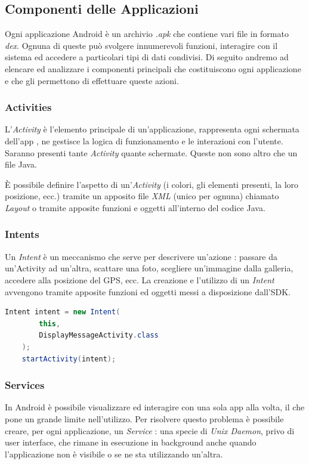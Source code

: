 \subsection{Componenti delle Applicazioni}
Ogni applicazione Android è un archivio \textit{.apk} che contiene vari file in formato \textit{dex}. Ognuna di queste può svolgere innumerevoli funzioni, interagire con il sistema ed accedere a particolari tipi di dati condivisi. Di seguito andremo ad elencare ed analizzare i componenti principali che costituiscono ogni applicazione e che gli permettono di effettuare queste azioni.

\subsubsection{Activities}
L'\textit{Activity} è l'elemento principale di un'applicazione, rappresenta ogni schermata dell'app \cite{androides}, ne gestisce la logica di funzionamento e le interazioni con l'utente. Saranno presenti tante \textit{Activity} quante schermate. Queste non sono altro che un file Java.

È possibile definire l'aspetto di un'\textit{Activity} (i colori, gli elementi presenti, la loro posizione, ecc.) tramite un apposito file \textit{XML} (unico per ognuna) chiamato \textit{Layout} o tramite apposite funzioni e oggetti all'interno del codice Java.

\subsubsection{Intents}
Un \textit{Intent} è un meccanismo che serve per descrivere un'azione \cite{androides}: passare da un'Activity ad un'altra, scattare una foto, scegliere un'immagine dalla galleria, accedere alla posizione del GPS, ecc.
La creazione e l'utilizzo di un \textit{Intent} avvengono tramite apposite funzioni ed oggetti messi a disposizione dall'SDK.\\

\begin{lstlisting}[language=Java, caption=Esempio di codice Java per l'avvio di un'Activity tramite Intent]
    Intent intent = new Intent(
        this, 
        DisplayMessageActivity.class
    );
    startActivity(intent);
\end{lstlisting}

\subsubsection{Services}
In Android è possibile visualizzare ed interagire con una sola app alla volta, il che pone un grande limite nell'utilizzo. Per risolvere questo problema è possibile creare, per ogni applicazione, un \textit{Service} \cite{androides}: una specie di \textit{Unix Daemon}, privo di user interface, che rimane in esecuzione in background anche quando l'applicazione non è visibile o se ne sta utilizzando un'altra.

